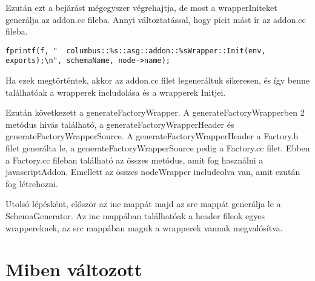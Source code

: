 Ezután ezt a bejárást mégegyszer végrehajtja, de most a wrapperIniteket generálja az addon.cc fileba.
Annyi változtatással, hogy picit mást ír az addon.cc fileba.
\begin{lstlisting}[caption={generateWrapInit leimplementálása}, label={addoncc_wrapper_inits_implementation}, language={CStyle}]
fprintf(f, "  columbus::%s::asg::addon::%sWrapper::Init(env, exports);\n", schemaName, node->name);
\end{lstlisting}

Ha ezek megtörténtek, akkor az addon.cc filet legeneráltuk sikeresen, és így benne találhatóak a wrapperek includolása és a wrapperek Initjei.

\noindent

Ezután következett a generateFactoryWrapper. A generateFactoryWrapperben 2 metódus hivás található, a generateFactoryWrapperHeader és generateFactoryWrapperSource.
A generateFactoryWrapperHeader a Factory.h filet generálta le, a generateFactoryWrapperSource pedig a Factory.cc filet.
Ebben a Factory.cc fileban található az összes metódus, amit fog használni a javascriptAddon.
Emellett az összes nodeWrapper includeolva van, amit ezután fog létrehozni.

\noindent

Utolsó lépésként, először az inc mappát majd az src mappát generálja le a SchemaGenerator.
Az inc mappában találhatóak a header fileok egyes wrappereknek, az src mappában maguk a wrapperek vannak megvalósítva.
\section{Miben változott}
